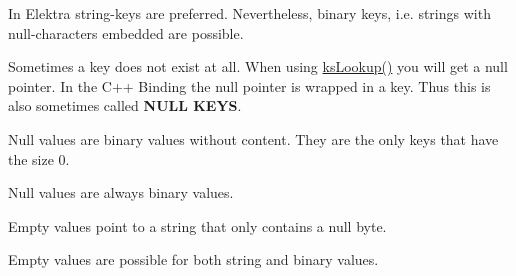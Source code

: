 In Elektra string-\/keys are preferred. Nevertheless, binary keys, i.\+e. strings with null-\/characters embedded are possible.

Sometimes a key does not exist at all. When using \mbox{\hyperlink{group__keyset_gaa34fc43a081e6b01e4120daa6c112004}{ks\+Lookup()}} you will get a null pointer. In the C++ Binding the null pointer is wrapped in a key. Thus this is also sometimes called {\bfseries{N\+U\+LL K\+E\+YS}}.

Null values are binary values without content. They are the only keys that have the size 0.

Null values are always binary values.

Empty values point to a string that only contains a null byte.

Empty values are possible for both string and binary values. 
